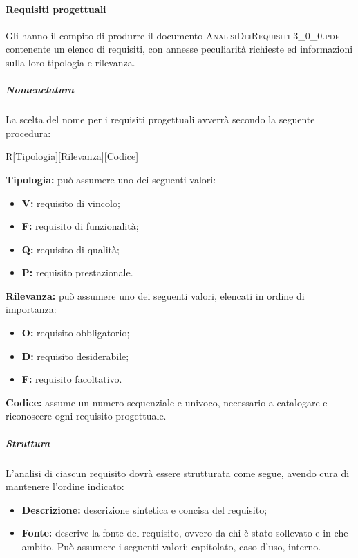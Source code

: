 		\paragraph{Requisiti progettuali}
		Gli \textit{\Anas} hanno il compito di produrre il documento \textsc{AnalisiDeiRequisiti 3\_0\_0.pdf} contenente un elenco di requisiti, con annesse peculiarità richieste ed informazioni sulla loro tipologia e rilevanza.
		
			\subparagraph{Nomenclatura}
			La scelta del nome per i requisiti progettuali avverrà secondo la seguente procedura:
			\begin{center}
			R[Tipologia][Rilevanza][Codice]
			\end{center}
			\textbf{Tipologia:} può assumere uno dei seguenti valori:
			\begin{itemize}
				\item \textbf{V:} requisito di vincolo;
				\item \textbf{F:} requisito di funzionalità;
				\item \textbf{Q:} requisito di qualità;
				\item \textbf{P:} requisito prestazionale.
			\end{itemize}
			\textbf{Rilevanza:} può assumere uno dei seguenti valori, elencati in ordine di importanza:
			\begin{itemize}
				\item \textbf{O:} requisito obbligatorio;
				\item \textbf{D:} requisito desiderabile;
				\item \textbf{F:} requisito facoltativo.
			\end{itemize}
			\textbf{Codice:} assume un numero sequenziale e univoco, necessario a catalogare e riconoscere ogni requisito progettuale.
		
			\subparagraph{Struttura}
			L'analisi di ciascun requisito dovrà essere strutturata come segue, avendo cura di mantenere l'ordine indicato:
			\begin{itemize}
			  \item \textbf{Descrizione:} descrizione sintetica e concisa del requisito;
			  \item \textbf{Fonte:} descrive la fonte del requisito, ovvero da chi è stato sollevato e in che ambito. Può assumere i seguenti valori: capitolato, caso d'uso, interno.
			\end{itemize}
	
